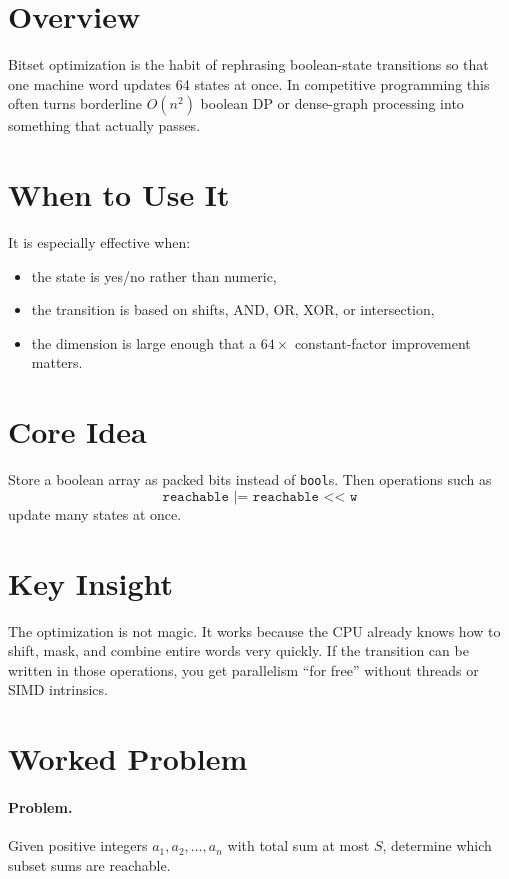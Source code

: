 \section*{Overview}

Bitset optimization is the habit of rephrasing boolean-state transitions so that one machine word updates 64 states at
once. In competitive programming this often turns borderline \(O(n^2)\) boolean DP or dense-graph processing into
something that actually passes.

\section*{When to Use It}

It is especially effective when:

\begin{itemize}
  \item the state is yes/no rather than numeric,
  \item the transition is based on shifts, AND, OR, XOR, or intersection,
  \item the dimension is large enough that a \(64\times\) constant-factor improvement matters.
\end{itemize}

\section*{Core Idea}

Store a boolean array as packed bits instead of \texttt{bool}s. Then operations such as
\[
\texttt{reachable |= reachable << w}
\]
update many states at once.

\section*{Key Insight}

The optimization is not magic. It works because the CPU already knows how to shift, mask, and combine entire words very
quickly. If the transition can be written in those operations, you get parallelism ``for free'' without threads or SIMD
intrinsics.

\section*{Worked Problem}

\paragraph{Problem.}
Given positive integers \(a_1, a_2, \dots, a_n\) with total sum at most \(S\), determine which subset sums are
reachable.

